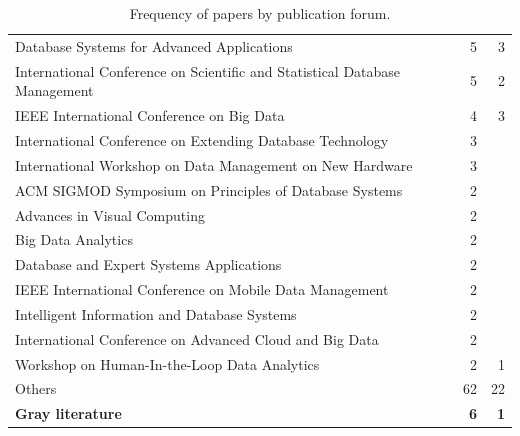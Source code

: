 \begin{table}[hptb]
\begin{tabularx}{\textwidth}{X r r}
      \hspace{0.5em} Database Systems for Advanced Applications                  &  5 &  3 \\
      \hspace{0.5em} International Conference on Scientific and Statistical Database Management & 5 & 2 \\
      \hspace{0.5em} IEEE International Conference on Big Data                     &  4 & 3 \\
      \hspace{0.5em} International Conference on Extending Database Technology     &  3 & \\
      \hspace{0.5em} International Workshop on Data Management on New Hardware     &  3 & \\
      \hspace{0.5em} ACM SIGMOD Symposium on Principles of Database Systems        &  2 & \\
      \hspace{0.5em} Advances in Visual Computing                                  &  2 & \\
      \hspace{0.5em} Big Data Analytics                                            &  2 & \\
      \hspace{0.5em} Database and Expert Systems Applications                      &  2 & \\
      \hspace{0.5em} IEEE International Conference on Mobile Data Management       &  2 & \\
      \hspace{0.5em} Intelligent Information and Database Systems                  &  2 & \\
      \hspace{0.5em} International Conference on Advanced Cloud and Big Data       &  2 & \\
      \hspace{0.5em} Workshop on Human-In-the-Loop Data Analytics                  &  2 &  1 \\
      \hspace{0.5em} Others                                                        & 62 & 22 \\
    \textbf{Gray literature} & \textbf{6} & \textbf{1}
  \end{tabularx}
  \caption{Frequency of papers by publication forum.}\label{tab:mapping/publication}
\end{table}

